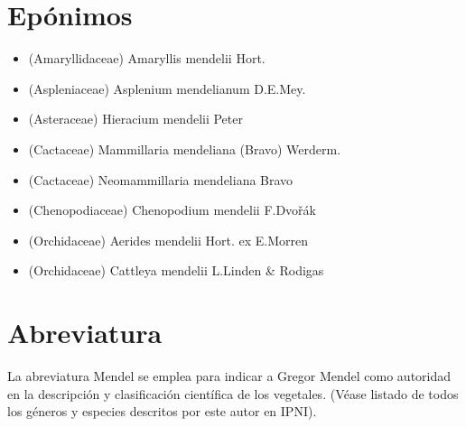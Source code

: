 \documentclass{report}
\begin{document}
\chapter{Epónimos}
\begin{itemize}
	\item (Amaryllidaceae) Amaryllis mendelii Hort.
	\item (Aspleniaceae) Asplenium  mendelianum D.E.Mey.
	\item (Asteraceae) Hieracium  mendelii Peter
	\item (Cactaceae) Mammillaria mendeliana (Bravo) Werderm.
	\item (Cactaceae) Neomammillaria mendeliana Bravo
	\item (Chenopodiaceae) Chenopodium  mendelii F.Dvořák
	\item (Orchidaceae) Aerides mendelii Hort. ex E.Morren
	\item (Orchidaceae) Cattleya mendelii L.Linden \& Rodigas	
\end{itemize}

\chapter{Abreviatura}
La abreviatura Mendel se emplea para indicar a Gregor Mendel como autoridad en la descripción y clasificación científica de los vegetales. (Véase listado de todos los géneros y especies descritos por este autor en IPNI).



\end{document}
